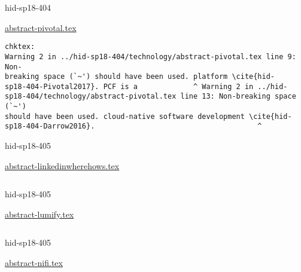 \begin{IU}

hid-sp18-404

\href{https://github.com/cloudmesh-community/hid-sp18-404/blob/master//technology/abstract-pivotal.tex}{abstract-pivotal.tex}

\begin{tiny}
\begin{verbatim}
chktex:
Warning 2 in ../hid-sp18-404/technology/abstract-pivotal.tex line 9: Non-
breaking space (`~') should have been used. platform \cite{hid-
sp18-404-Pivotal2017}. PCF is a             ^ Warning 2 in ../hid-
sp18-404/technology/abstract-pivotal.tex line 13: Non-breaking space (`~')
should have been used. cloud-native software development \cite{hid-
sp18-404-Darrow2016}.                                      ^
\end{verbatim}
\end{tiny}
\end{IU}



\begin{IU}

hid-sp18-405

\href{https://github.com/cloudmesh-community/hid-sp18-405/blob/master//technology/abstract-linkedinwherehows.tex}{abstract-linkedinwherehows.tex}

\begin{tiny}
\begin{verbatim}
\end{verbatim}
\end{tiny}
\end{IU}



\begin{IU}

hid-sp18-405

\href{https://github.com/cloudmesh-community/hid-sp18-405/blob/master//technology/abstract-lumify.tex}{abstract-lumify.tex}

\begin{tiny}
\begin{verbatim}
\end{verbatim}
\end{tiny}
\end{IU}



\begin{IU}

hid-sp18-405

\href{https://github.com/cloudmesh-community/hid-sp18-405/blob/master//technology/abstract-nifi.tex}{abstract-nifi.tex}

\begin{tiny}
\begin{verbatim}
\end{verbatim}
\end{tiny}
\end{IU}

